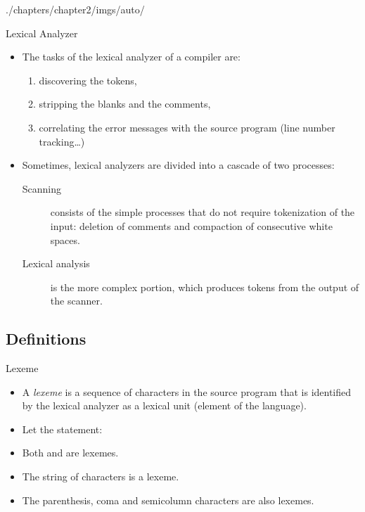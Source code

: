 \begin{graphicspathcontext}{{./chapters/chapter2/imgs/auto/}}
\begin{bibunit}[apalike]
\begin{frame}{Lexical Analyzer}
	\begin{itemize}
	\item The tasks of the lexical analyzer of a compiler are: \begin{enumerate}
		\item discovering the tokens,
		\item stripping the blanks and the comments,
		\item correlating the error messages with the source program (line number tracking\dots)
		\end{enumerate}
	\vspace{1em}
	\item Sometimes, lexical analyzers are divided into a cascade of two processes: \begin{description}
		\item[Scanning] consists of the simple processes that do not require tokenization of the input: deletion of comments and compaction of consecutive white spaces.
		\item[Lexical analysis] is the more complex portion, which produces tokens from the output of the scanner.
		\end{description}
	\end{itemize}
\end{frame}

\subsection{Definitions}
\begin{frame}{Lexeme}
	\begin{itemize}
	\item A \emph{lexeme} is a sequence of characters in the source program that is identified by the lexical analyzer as a lexical unit (element of the language).
	\end{itemize}
	\vfill
	\begin{example}
		\begin{itemize}
		\item Let the statement: 
		\item Both  and  are lexemes.
		\item The string of characters is a lexeme.
		\item The parenthesis, coma and semicolumn characters are also lexemes.
		\end{itemize}
	\end{example}
\end{frame}


\end{bibunit}
\end{graphicspathcontext}
